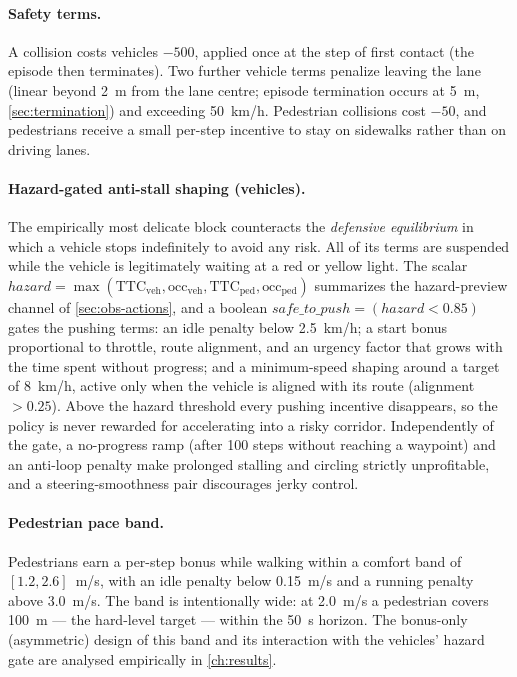 \paragraph{Safety terms.}
A collision costs vehicles $-500$, applied once at the step of first
contact (the episode then terminates). Two further vehicle terms penalize
leaving the lane (linear beyond \SI{2}{m} from the lane centre; episode
termination occurs at \SI{5}{m}, \cref{sec:termination}) and exceeding
50~km/h. Pedestrian collisions cost $-50$, and pedestrians receive a
small per-step incentive to stay on sidewalks rather than on driving
lanes.

\paragraph{Hazard-gated anti-stall shaping (vehicles).}
The empirically most delicate block counteracts the \emph{defensive
equilibrium} in which a vehicle stops indefinitely to avoid any risk. All
of its terms are suspended while the vehicle is legitimately waiting at a
red or yellow light. The scalar $\mathit{hazard} =
\max(\text{TTC}_{\mathrm{veh}}, \text{occ}_{\mathrm{veh}},
\text{TTC}_{\mathrm{ped}}, \text{occ}_{\mathrm{ped}})$ summarizes the
hazard-preview channel of \cref{sec:obs-actions}, and a boolean
$\mathit{safe\_to\_push} = (\mathit{hazard} < 0.85)$ gates the pushing
terms: an idle penalty below 2.5~km/h; a start bonus proportional to
throttle, route alignment, and an urgency factor that grows with the time
spent without progress; and a minimum-speed shaping around a target of
8~km/h, active only when the vehicle is aligned with its route (alignment
$> 0.25$). Above the hazard threshold every pushing incentive disappears,
so the policy is never rewarded for accelerating into a risky corridor.
Independently of the gate, a no-progress ramp (after 100 steps without
reaching a waypoint) and an anti-loop penalty make prolonged stalling and
circling strictly unprofitable, and a steering-smoothness pair discourages
jerky control.

\paragraph{Pedestrian pace band.}
Pedestrians earn a per-step bonus while walking within a comfort band of
$[1.2, 2.6]$~m/s, with an idle penalty below 0.15~m/s and a running
penalty above 3.0~m/s. The band is intentionally wide: at 2.0~m/s a
pedestrian covers \SI{100}{m} --- the hard-level target --- within the
\SI{50}{s} horizon. The bonus-only (asymmetric) design of this band and
its interaction with the vehicles' hazard gate are analysed empirically in
\cref{ch:results}.

